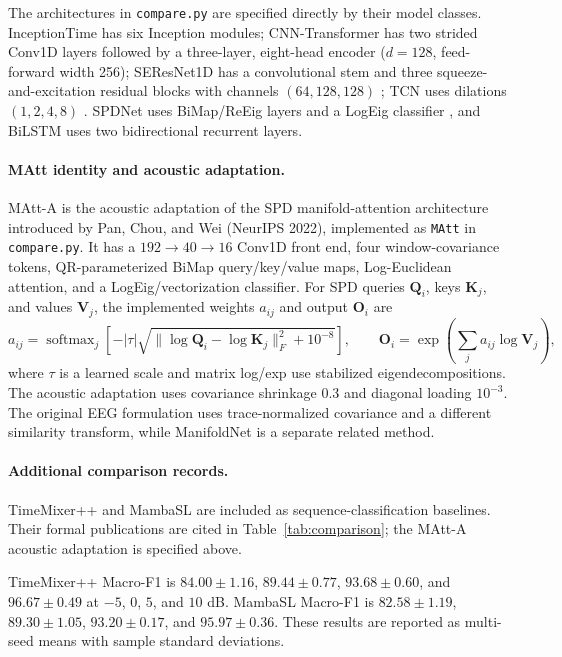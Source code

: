 The architectures in \texttt{compare.py} are specified directly by their model classes. InceptionTime \citep{fawaz2020inceptiontime} has six Inception modules; CNN-Transformer has two strided Conv1D layers followed by a three-layer, eight-head encoder ($d=128$, feed-forward width 256); SEResNet1D has a convolutional stem and three squeeze-and-excitation residual blocks with channels $(64,128,128)$ \citep{hu2020senet}; TCN uses dilations $(1,2,4,8)$ \citep{bai2018tcn}. SPDNet uses BiMap/ReEig layers and a LogEig classifier \citep{huang2017spdnet}, and BiLSTM uses two bidirectional recurrent layers.

\paragraph{MAtt identity and acoustic adaptation.}
MAtt-A is the acoustic adaptation of the SPD manifold-attention architecture introduced by Pan, Chou, and Wei \citep{pan2022matt} (NeurIPS 2022), implemented as \texttt{MAtt} in \texttt{compare.py}. It has a $192\!\to\!40\!\to\!16$ Conv1D front end, four window-covariance tokens, QR-parameterized BiMap query/key/value maps, Log-Euclidean attention, and a LogEig/vectorization classifier. For SPD queries $\mathbf Q_i$, keys $\mathbf K_j$, and values $\mathbf V_j$, the implemented weights $a_{ij}$ and output $\mathbf O_i$ are
\begin{equation}
a_{ij}=\operatorname{softmax}_{j}\!\left[-|\tau|\sqrt{\|\log\mathbf Q_i-\log\mathbf K_j\|_F^2+10^{-8}}\right],
\qquad \mathbf O_i=\exp\!\left(\sum_j a_{ij}\log\mathbf V_j\right),
\label{eq:matt-adaptation}
\end{equation}
where $\tau$ is a learned scale and matrix log/exp use stabilized eigendecompositions. The acoustic adaptation uses covariance shrinkage 0.3 and diagonal loading $10^{-3}$. The original EEG formulation uses trace-normalized covariance and a different similarity transform, while ManifoldNet is a separate related method.

\paragraph{Additional comparison records.}
TimeMixer++ \citep{wang2025timemixerpp} and MambaSL \citep{jung2026mambasl} are included as sequence-classification baselines. Their formal publications are cited in Table~\ref{tab:comparison}; the MAtt-A acoustic adaptation is specified above.

TimeMixer++ Macro-F1 is $84.00{\pm}1.16$, $89.44{\pm}0.77$, $93.68{\pm}0.60$, and $96.67{\pm}0.49$ at $-5$, $0$, $5$, and $10$ dB. MambaSL Macro-F1 is $82.58{\pm}1.19$, $89.30{\pm}1.05$, $93.20{\pm}0.17$, and $95.97{\pm}0.36$. These results are reported as multi-seed means with sample standard deviations.
